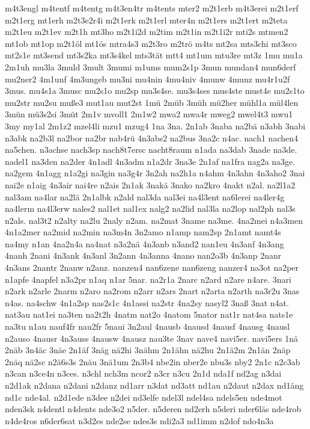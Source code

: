 {m4t3engl
m4tentf
m4tentg
m4t3en4tr
m4tents
mter2
m2t1erb
m4t3erei
m2t1erf
m2t1erg
mt1erh
m2t3e2r4i
m2t1erk
m2t1erl
mter4n
m2t1ers
m2t1ert
m2teta
m2t1eu
m2t1ev
m2t1h
mt3ho
m2t1i2d
m2tim
m2t1in
m2t1i2r
mti2s
mtmen2
mt1ob
mt1op
m2t1öl
mt1ös
mtra4s3
m2t3ro
m2trö
m4ts
mt2sa
mts3chi
mt3sco
mt2s1e
mt3send
mt3s2ka
mt3s4kel
mts3tät
mtt4
mt1um
mtu3re
mt3z
1mu
mu1a
2m1uh
mu3la
3muld
3mult
3mumi
m1ums
mum2s1p
3mun
mundan4
mun6derf
mu2ner2
4m1unf
4m3ungeb
mu3ni
mu4nin
4mu4niv
4munw
4munz
mu4r1u2f
3mus.
mu4s1a
3musc
mu2s1o
mu2sp
mu3s4se.
mu3s4ses
mus4ste
must4e
mu2s1to
mu2str
mu2su
muße3
mut1au
mut2st
1mü
2müb
3müh
mü2her
mühl1a
mül4len
3mün
mü3s2si
3müt
2m1v
mvoll1
2m1w2
mwa2
mwa4r
mweg2
mwel4t3
mwu1
3my
my1al
2m1z2
mzel4li
mzu1
mzug4
1na
3na.
2n1ab
3naba
na2bä
n3abh
3nabi
n3abk
na2b3l
na2bor
na2br
nab4rü
4n3abs2
na2bus
3na2c
n4ac.
nach1
nachen4
na5chen.
n3achse
nach3sp
nach8t7ersc
nacht8raum
n1ada
na3dab
3nade
na3de.
nadel1
na3den
na2der
4n1adl
4n3adm
n1a2dr
3na3e
2n1af
na1fra
nag2a
na3ge.
na2gem
4n1agg
n1a2gi
na3gin
na3g4r
3n2ah
na2h1a
n4ahm
4n3ahn
4n3aho2
3nai
nai2e
n1aig
4n3air
nai4re
n2ais
2n1ak
3nakä
3nako
na2kro
4nakt
n2al.
na2l1a2
nal3am
na4lar
na2lä
2n1albk
n2ald
nal3da
nal3ei
na4l3ent
na6lerei
na4ler4g
na4lerm
na4l3erw
nales2
nal1et
nal1ex
nalg2
na2lid
nal3la
na2lop
nal2ph
nal3s
n2als.
nal3t2
n2alty
na2lu
2naly
n2am.
na2mat
3name
na3me.
4na2mei
n4a3men
4n1a2mer
na2mid
na2min
na3m4n
3n2amo
n1amp
nam2sp
2n1amt
namt4s
na4my
n1an
4na2n4a
na4nat
n3a2nä
4n3anb
n3and2
nan1eu
4n3anf
4n3ang
4nanh
2nani
4n3ank
4n3anl
3n2ann
4n3anna
4nano
nan2o3b
4n3anp
2nanr
4n3ans
2nantr
2nanw
n2anz.
nanzen4
nan6zene
nan6zeng
nanzer4
na3ot
na2per
n1apfe
4napfel
n3a2pr
n1aq
n1ar
5nar.
na2r1a
2narc
n2ard
n2are
n4are.
3nari
n2ark
n2arle
2narm
n2aro
na2rom
n2arr
n2ars
2nart
n2arta
n2arth
na3r2u
3nas
n4as.
na4schw
4n1a2sp
nas2s1c
4n1assi
na2str
4na2sy
nasyl2
3naß
3nat
n4at.
nat3au
nat1ei
na3ten
na2t2h
4natm
nat2o
4natom
5nator
nat1r
nat4sa
nats1e
na3tu
n1au
nauf4fr
nau2fr
5naui
3n2aul
4nausb
4nausd
4nausf
4nausg
4nausl
n2auso
4nausr
4n3auss
4nausw
4nausz
nau3te
3nav
nave4
navi5er.
navi5ers
1nä
2näb
3n4äc
3näe
2n1äf
3näg
nä2hi
3nähm
2n1ähn
nä2hu
2n1ä2m
2n1än
2näp
2näq
nä2sc
n2ä6s3s
2näu
3nä1um
2n3b4
nbe2in
nber2e
nbu3s
nby2
2n1c
n2c3ab
n3can
n3ce4n
n3ces.
n3chl
nch3m
ncor2
n3cr
n3cu
2n1d
nda1f
nd2ag
n3dai
n2d1ak
n2dana
n2dani
n2danz
nd1arr
n3dat
nd3att
nd1au
n2daut
n2dax
nd1äng
nd1c
nde4al.
n2d1ede
n3dee
n2dei
nd3elfe
ndel3l
ndel4sa
ndels5en
nde4mot
nden3sk
n4dentl
n4dents
nde3o2
n5der.
n5deren
nd2erh
n5deri
nder6läs
nde4rob
n4de4ros
n6der6sat
n3d2es
nde2se
ndes3s
ndi2a3
nd1imm
n2dof
ndo4n3a
}
